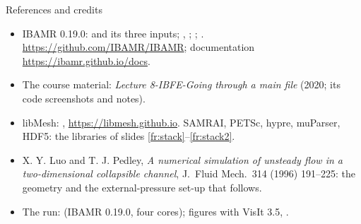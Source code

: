 \documentclass[aspectratio=169,11pt]{beamer}
\begin{document}
\begin{frame}{References and credits}
\label{fr:refs}
\scriptsize
\begin{itemize}
  \item IBAMR 0.19.0:  and its three inputs; , ; ; . \url{https://github.com/IBAMR/IBAMR}; documentation \url{https://ibamr.github.io/docs}.
  \item The course material: \emph{Lecture 8-IBFE-Going through a main file} (2020; its code screenshots and notes).
  \item libMesh: , \url{https://libmesh.github.io}. SAMRAI, PETSc, hypre, muParser, HDF5: the libraries of slides \ref{fr:stack}--\ref{fr:stack2}.
  \item X. Y. Luo and T. J. Pedley, \emph{A numerical simulation of unsteady flow in a two-dimensional collapsible channel}, J.\ Fluid Mech.\ 314 (1996) 191--225: the geometry and the external-pressure set-up that  follows.
  \item The run:  (IBAMR 0.19.0, four cores); figures with VisIt 3.5, .
\end{itemize}
\end{frame}
\end{document}
